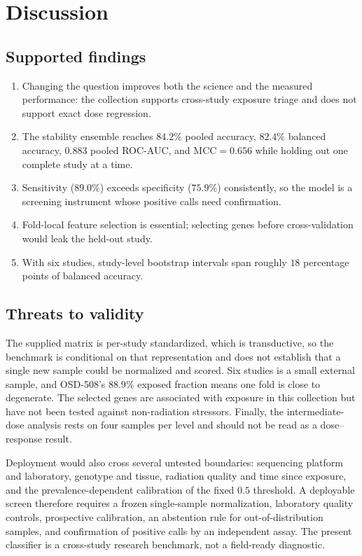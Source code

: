 \documentclass[manuscript,nonacm]{acmart}
\begin{document}
\section{Discussion}

\subsection{Supported findings}
\begin{enumerate}
\item Changing the question improves both the science and the measured performance: the
      collection supports cross-study exposure triage and does not support exact dose
      regression.
\item The stability ensemble reaches $84.2\%$ pooled accuracy, $82.4\%$ balanced
      accuracy, $0.883$ pooled ROC-AUC, and $\mathrm{MCC}=0.656$ while holding out one
      complete study at a time.
\item Sensitivity ($89.0\%$) exceeds specificity ($75.9\%$) consistently, so the model is
      a screening instrument whose positive calls need confirmation.
\item Fold-local feature selection is essential; selecting genes before cross-validation
      would leak the held-out study.
\item With six studies, study-level bootstrap intervals span roughly $18$ percentage
      points of balanced accuracy.
\end{enumerate}

\subsection{Threats to validity}
The supplied matrix is per-study standardized, which is transductive, so the benchmark is
conditional on that representation and does not establish that a single new sample could
be normalized and scored. Six studies is a small external sample, and OSD-508's $88.9\%$
exposed fraction means one fold is close to degenerate. The selected genes are associated
with exposure in this collection but have not been tested against non-radiation
stressors. Finally, the intermediate-dose analysis rests on four samples per level and
should not be read as a dose--response result.

Deployment would also cross several untested boundaries: sequencing platform and
laboratory, genotype and tissue, radiation quality and time since exposure, and the
prevalence-dependent calibration of the fixed $0.5$ threshold. A deployable screen
therefore requires a frozen single-sample normalization, laboratory quality controls,
prospective calibration, an abstention rule for out-of-distribution samples, and
confirmation of positive calls by an independent assay. The present classifier is a
cross-study research benchmark, not a field-ready diagnostic.
\end{document}
